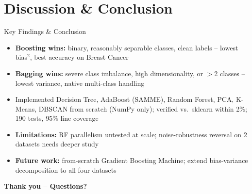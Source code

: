\documentclass[aspectratio=169,11pt]{beamer}
\begin{document}
\section{Discussion \& Conclusion}
\begin{frame}{Key Findings \& Conclusion}
\begin{itemize}\small
  \item \textbf{Boosting wins:} binary, reasonably separable classes, clean labels --
  lowest bias$^2$, best accuracy on Breast Cancer
  \item \textbf{Bagging wins:} severe class imbalance, high dimensionality, or $>$2
  classes -- lowest variance, native multi-class handling
  \item Implemented Decision Tree, AdaBoost (SAMME), Random Forest, PCA, K-Means,
  DBSCAN from scratch (NumPy only); verified vs.\ sklearn within 2\%; 190 tests,
  95\% line coverage
  \item \textbf{Limitations:} RF parallelism untested at scale; noise-robustness
  reversal on 2 datasets needs deeper study
  \item \textbf{Future work:} from-scratch Gradient Boosting Machine; extend
  bias-variance decomposition to all four datasets
\end{itemize}
\vfill
\begin{center}
\Large\textbf{Thank you -- Questions?}
\end{center}
\end{frame}
\end{document}
